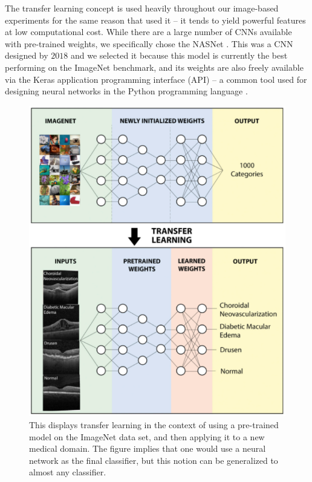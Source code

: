 \documentclass[../thesis.tex]{subfiles}
\begin{document}
The transfer learning concept is used heavily throughout our image-based
experiments for the same reason that \cite{sharif2014cnn} used it -- it tends to
yield powerful features at low computational cost. While there are a large
number of CNNs available with pre-trained weights, we specifically chose the
NASNet \cite{zoph2018learning}. This was a CNN designed by $2018$ and we
selected it because this model is currently the best performing on the ImageNet
benchmark, and its weights are also freely available via the Keras application
programming interface (API) -- a common tool used for designing neural networks
in the Python programming language \cite{chollet2015keras}.
\begin{figure}
    \centering
    \includegraphics[width=\linewidth]{images/transfer_learning.pdf}
    \caption[Transfer Learning Example]{This displays transfer learning in the
    context of using a pre-trained model on the ImageNet data set, and then
    applying it to a new medical domain. The figure implies that one would use a
    neural network as the final classifier, but this notion can be generalized
    to almost any classifier.}
    \label{fig:transfer_learning}
\end{figure}
\end{document}
